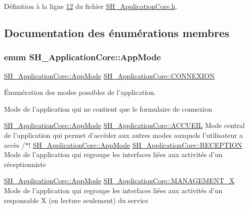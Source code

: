 Définition à la ligne \hyperlink{SH__ApplicationCore_8h_source_l00012}{12} du fichier \hyperlink{SH__ApplicationCore_8h_source}{S\-H\-\_\-\-Application\-Core.\-h}.



\subsection{Documentation des énumérations membres}
\hypertarget{classSH__ApplicationCore_a6b93b2f83a290305f282616eb2935899}{
\subsubsection[{App\-Mode}]{\setlength{\rightskip}{0pt plus 5cm}enum {\bf S\-H\-\_\-\-Application\-Core\-::\-App\-Mode}}}\label{classSH__ApplicationCore_a6b93b2f83a290305f282616eb2935899}


\hyperlink{classSH__ApplicationCore_a6b93b2f83a290305f282616eb2935899}{S\-H\-\_\-\-Application\-Core\-::\-App\-Mode} \hyperlink{classSH__ApplicationCore_a6b93b2f83a290305f282616eb2935899a3594de687d70f634e91ef60a63b74172}{S\-H\-\_\-\-Application\-Core\-::\-C\-O\-N\-N\-E\-X\-I\-O\-N} 

Énumération des modes possibles de l'application.

Mode de l'application qui ne contient que le formulaire de connexion

\hyperlink{classSH__ApplicationCore_a6b93b2f83a290305f282616eb2935899}{S\-H\-\_\-\-Application\-Core\-::\-App\-Mode} \hyperlink{classSH__ApplicationCore_a6b93b2f83a290305f282616eb2935899a1892b908076a0887805e80f590ecdef4}{S\-H\-\_\-\-Application\-Core\-::\-A\-C\-C\-U\-E\-I\-L} Mode central de l'application qui permet d'accéder aux autres modes auxquels l'utilisateur a accès /$\ast$!  \hyperlink{classSH__ApplicationCore_a6b93b2f83a290305f282616eb2935899}{S\-H\-\_\-\-Application\-Core\-::\-App\-Mode} \hyperlink{classSH__ApplicationCore_a6b93b2f83a290305f282616eb2935899a16687d65e8feb3b768ff655d73a45916}{S\-H\-\_\-\-Application\-Core\-::\-R\-E\-C\-E\-P\-T\-I\-O\-N} Mode de l'application qui regroupe les interfaces liées aux activités d'un réceptionniste

\hyperlink{classSH__ApplicationCore_a6b93b2f83a290305f282616eb2935899}{S\-H\-\_\-\-Application\-Core\-::\-App\-Mode} \hyperlink{classSH__ApplicationCore_a6b93b2f83a290305f282616eb2935899ae3d0d6045024cbde467f9c8cb536c6a8}{S\-H\-\_\-\-Application\-Core\-::\-M\-A\-N\-A\-G\-E\-M\-E\-N\-T\-\_\-\-X} Mode de l'application qui regroupe les interfaces liées aux activités d'un responsable X (en lecture seulement) du service

